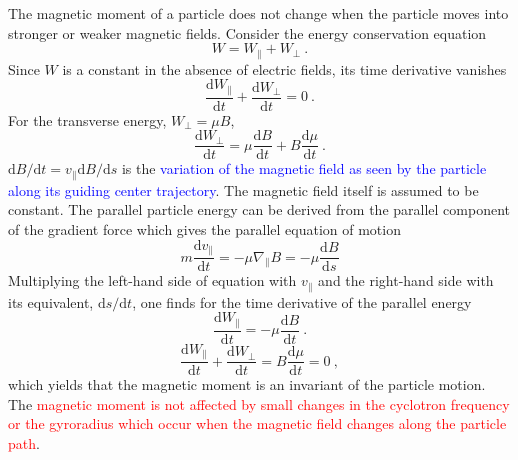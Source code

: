 \documentclass[12pt,a4paper]{article}
\newcommand{\dif}{\mathrm{d}}
\begin{document}
\cite{1996bspp.book.....B} The magnetic moment of a particle does not change when the particle moves into stronger or weaker magnetic fields. Consider the energy conservation equation
\begin{equation}
W = W_\parallel +W_\perp ~.
\end{equation}
Since $W$ is a constant in the absence of electric fields, its time derivative vanishes
\begin{equation}
\dfrac{\dif W_\parallel}{\dif t} + \dfrac{\dif W_\perp}{\dif t} = 0 ~.
\end{equation}
For the transverse energy, $W_\perp = \mu B$, 
\begin{equation}
 \dfrac{\dif W_\perp}{\dif t} = \mu  \dfrac{\dif B}{\dif t} +B  \dfrac{\dif \mu}{\dif t} ~.
\end{equation}
$\dif B/\dif t = v_\parallel \dif B/\dif s$ is the \textcolor{blue}{variation of the magnetic field as seen by the particle along its guiding center trajectory}. The magnetic field itself is assumed to be constant. The parallel particle energy can be derived from the parallel component of the gradient force which gives the parallel equation of motion
\begin{equation}
m \dfrac{\dif v_\parallel}{\dif t} = -\mu \nabla_\parallel B = -\mu \dfrac{\dif B}{\dif s}
\end{equation}
Multiplying the left-hand side of equation with $v_\parallel$ and the right-hand side with its equivalent, $\dif s /\dif t$, one finds for the time derivative of the parallel energy
\begin{equation}
\dfrac{\dif W_\parallel}{\dif t} = -\mu \dfrac{\dif B}{\dif t} ~.
\end{equation}
\begin{equation}
\dfrac{\dif W_\parallel}{\dif t} + \dfrac{\dif W_\perp}{\dif t} = B  \dfrac{\dif \mu}{\dif t} = 0 ~,
\end{equation}
which yields that the magnetic moment is an invariant of the particle motion. The \textcolor{red}{magnetic moment is not affected by small changes in the cyclotron frequency or the gyroradius which occur when the magnetic field changes along the particle path}.
\end{document}
